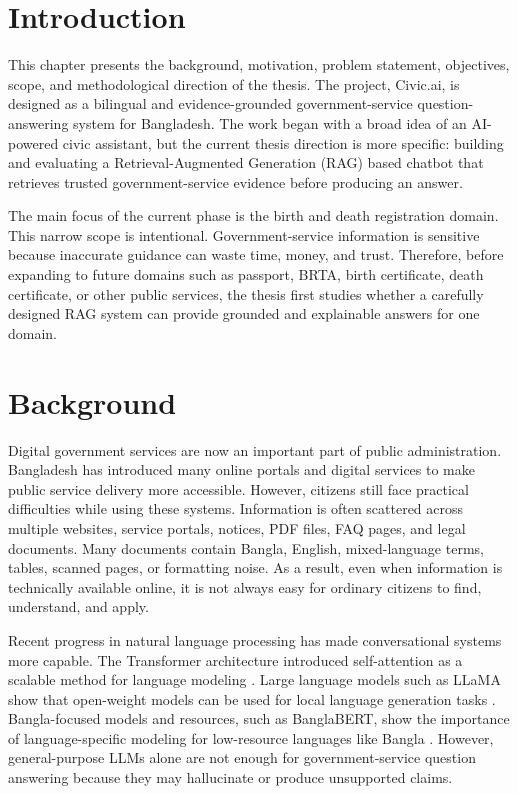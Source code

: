 \section{Introduction}
This chapter presents the background, motivation, problem statement, objectives, scope, and methodological direction of the thesis. The project, Civic.ai, is designed as a bilingual and evidence-grounded government-service question-answering system for Bangladesh. The work began with a broad idea of an AI-powered civic assistant, but the current thesis direction is more specific: building and evaluating a Retrieval-Augmented Generation (RAG) based chatbot that retrieves trusted government-service evidence before producing an answer.

The main focus of the current phase is the birth and death registration domain. This narrow scope is intentional. Government-service information is sensitive because inaccurate guidance can waste time, money, and trust. Therefore, before expanding to future domains such as passport, BRTA, birth certificate, death certificate, or other public services, the thesis first studies whether a carefully designed RAG system can provide grounded and explainable answers for one domain.

\section{Background}
Digital government services are now an important part of public administration. Bangladesh has introduced many online portals and digital services to make public service delivery more accessible. However, citizens still face practical difficulties while using these systems. Information is often scattered across multiple websites, service portals, notices, PDF files, FAQ pages, and legal documents. Many documents contain Bangla, English, mixed-language terms, tables, scanned pages, or formatting noise. As a result, even when information is technically available online, it is not always easy for ordinary citizens to find, understand, and apply.

Recent progress in natural language processing has made conversational systems more capable. The Transformer architecture introduced self-attention as a scalable method for language modeling \cite{vaswani2017attention}. Large language models such as LLaMA show that open-weight models can be used for local language generation tasks \cite{touvron2023llama,dubey2024llama3}. Bangla-focused models and resources, such as BanglaBERT, show the importance of language-specific modeling for low-resource languages like Bangla \cite{bhattacharjee2021banglabert}. However, general-purpose LLMs alone are not enough for government-service question answering because they may hallucinate or produce unsupported claims.

